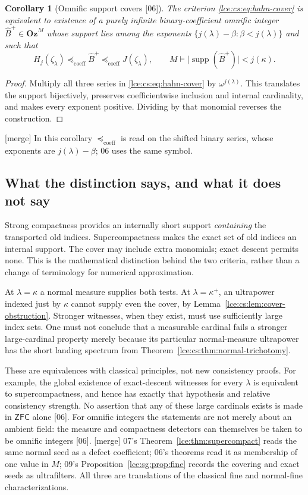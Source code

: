 \documentclass[11pt,letterpaper]{article}
\numberwithin{equation}{section}
\newtheorem{corollary}[theorem]{Corollary}
\theoremstyle{definition}
\theoremstyle{remark}
\newcommand{\Oz}{\mathbf{Oz}}
\newcommand{\supp}{\operatorname{supp}}
\newcommand{\abs}[1]{\lvert#1\rvert}
\newcommand{\ZFC}{\mathsf{ZFC}}
\newcommand{\thref}[1]{Theorem~\ref{#1}}
\newcommand{\prref}[1]{Proposition~\ref{#1}}
\newcommand{\leref}[1]{Lemma~\ref{#1}}
\newcommand{\src}[1]{\textup{\textsf{\small[#1]}}}%
\newcommand{\mergetag}{\textup{\textsf{\small[merge]}}}%
\newcommand{\lecoeff}{\preccurlyeq_{\mathrm{coeff}}}
\begin{document}
\begin{corollary}[Omnific support covers \src{06}]\label{lce:cs:cor:integer-cover}
The criterion \eqref{lce:cs:eq:hahn-cover} is equivalent to existence of a
purely infinite binary-coefficient omnific integer $\widehat B^+\in\Oz^M$
whose support lies among the exponents $\{j(\lambda)-\beta:\beta<j(\lambda)\}$
and such that
\[
 H_j(\zeta_\lambda)\lecoeff\widehat B^+\lecoeff J(\zeta_\lambda),
 \qquad M\models\abs{\supp(\widehat B^+)}<j(\kappa).
\]
\end{corollary}
\begin{proof}
Multiply all three series in \eqref{lce:cs:eq:hahn-cover} by
$\omega^{j(\lambda)}$. This translates the support bijectively, preserves
coefficientwise inclusion and internal cardinality, and makes every
exponent positive. Dividing by that monomial reverses the construction.
\end{proof}
\mergetag{} In this corollary $\lecoeff$ is read on the shifted binary
series, whose exponents are $j(\lambda)-\beta$; 06 uses the same symbol.

\subsection{What the distinction says, and what it does not say}
Strong compactness provides an internally short support \emph{containing}
the transported old indices. Supercompactness makes the exact set of old
indices an internal support. The cover may include extra monomials; exact
descent permits none. This is the mathematical distinction behind the two
criteria, rather than a change of terminology for numerical approximation.

At $\lambda=\kappa$ a normal measure supplies both tests. At
$\lambda=\kappa^+$, an ultrapower indexed just by $\kappa$ cannot supply even
the cover, by \leref{lce:cs:lem:cover-obstruction}. Stronger witnesses, when
they exist, must use sufficiently large index sets. One must not conclude
that a measurable cardinal fails a stronger large-cardinal property merely
because its particular normal-measure ultrapower has the short landing
spectrum from \thref{lce:cs:thm:normal-trichotomy}.

These are equivalences with classical principles, not new consistency
proofs. For example, the global existence of exact-descent witnesses for
every $\lambda$ is equivalent to supercompactness, and hence has exactly that
hypothesis and relative consistency strength. No assertion that any of these
large cardinals exists is made in $\ZFC$ alone \src{06}. For omnific
integers the statements are not merely about an ambient field: the measure
and compactness detectors can themselves be taken to be omnific integers
\src{06}. \mergetag{} 07's \thref{lce:thm:supercompact} reads the same
normal seed as a defect coefficient; 06's theorems read it as membership of
one value in $M$; 09's \prref{lce:sg:prop:fine} records the covering and
exact seeds as ultrafilters. All three are translations of the classical
fine and normal-fine characterizations.
\end{document}
